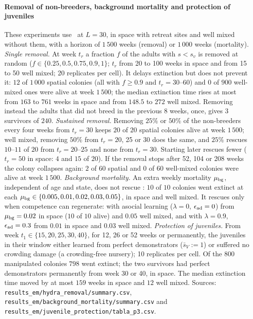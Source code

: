 \paragraph{Removal of non-breeders, background mortality and protection of juveniles}
These experiments use \Cone\ at $L=30$, in space with retreat sites and well mixed without them, with a horizon of
$1\,500$ weeks (removal) or $1\,000$ weeks (mortality). \emph{Single removal.} At week $t_r$ a fraction $f$ of the
adults with $s<s_v$ is removed at random ($f\in\{0.25,0.5,0.75,0.9,1\}$; $t_r$ from 20 to 100 weeks in space and from
15 to 50 well mixed; 20 replicates per cell). It delays extinction but does not prevent it: $12$ of $1\,000$ spatial
colonies (all with $f\ge0.9$ and $t_r=30$--$60$) and $0$ of $900$ well-mixed ones were alive at week $1\,500$; the
median extinction time rises at most from $163$ to $761$ weeks in space and from $148.5$ to $272$ well mixed. Removing
instead the adults that did not breed in the previous 8 weeks, once, gives $3$ survivors of $240$. \emph{Sustained
removal.} Removing $25\%$ or $50\%$ of the non-breeders every four weeks from $t_r=30$ keeps $20$ of $20$ spatial colonies
alive at week $1\,500$; well mixed, removing $50\%$ from $t_r=20$, 25 or 30 does the same, and $25\%$ rescues $10$--$11$
of $20$ from $t_r=20$--$25$ and none from $t_r=30$. Starting later rescues fewer ($t_r=50$ in space: $4$ and $15$ of
$20$). If the removal stops after 52, 104 or 208 weeks the colony collapses again: $2$ of $60$ spatial and $0$ of $60$
well-mixed colonies were alive at week $1\,500$. \emph{Background mortality.} An extra weekly mortality $\mu_{\rm bg}$,
independent of age and state, does not rescue \Cone: $10$ of $10$ colonies went extinct at each
$\mu_{\rm bg}\in\{0.005,0.01,0.02,0.03,0.05\}$, in space and well mixed. It rescues only when competence can
regenerate: with asocial learning ($\lambda=0$, $\epsilon_{\rm ad}=0$) from $\mu_{\rm bg}=0.02$ in space ($10$ of $10$ alive) and
$0.05$ well mixed, and with $\lambda=0.9$, $\epsilon_{\rm ad}=0.3$ from $0.01$ in space and $0.03$ well mixed. \emph{Protection
of juveniles.} From week $t_1\in\{15,20,25,30,40\}$, for 12, 26 or 52 weeks or permanently, the juveniles in their
window either learned from perfect demonstrators ($\bar s_V:=1$) or suffered no crowding damage (a crowding-free
nursery); 10 replicates per cell. Of the $800$ manipulated colonies $798$ went extinct; the two survivors had perfect
demonstrators permanently from week 30 or 40, in space. The median extinction time moved by at most $159$ weeks in
space and $12$ well mixed. Sources: \texttt{results\_em/hydra\_removal/summary.csv},
\texttt{results\_em/background\_mortality/summary.csv} and \texttt{results\_em/juvenile\_protection/tabla\_p3.csv}.

